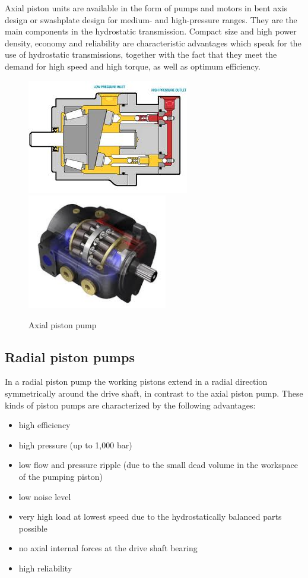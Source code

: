 Axial piston units are available in the form of pumps and motors in bent axis design or swashplate design for medium- and high-pressure ranges. They are the main components in the hydrostatic transmission. Compact size and high power density, economy and reliability are characteristic advantages which speak for the use of hydrostatic transmissions, together with the fact that they meet the demand for high speed and high torque, as well as optimum efficiency. 

\begin{figure}[h!]
\begin{center}
\includegraphics[height=5cm]{figs/axial_piston_pump.jpg}
\includegraphics[height=5cm]{figs/axial_piston_pump_cutaway.jpg}
\caption{\label{fig:ax_pp} Axial piston pump}
\end{center}
\end{figure}

\subsection{Radial piston pumps}

In a radial piston pump the working pistons extend in a radial direction symmetrically around the drive shaft, in contrast to the axial piston pump. These kinds of piston pumps are characterized by the following advantages:
\begin{itemize}
\item high efficiency
\item  high pressure (up to 1,000 bar)
\item  low flow and pressure ripple (due to the small dead volume in the workspace of the pumping piston)
\item low noise level
\item very high load at lowest speed due to the hydrostatically balanced parts possible
\item no axial internal forces at the drive shaft bearing
\item high reliability
\end{itemize}


